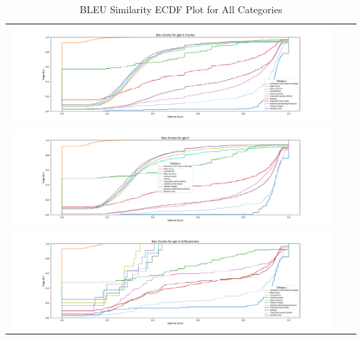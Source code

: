 \documentclass{article}
\begin{document}
\begin{table}[ht] 
\centering 
\begin{tabular}{ccc} 
\includegraphics[width=1.0\textwidth]{plots/bleu-ecdf-plot-gpt-3.5-turbo.png}  \\  
\includegraphics[width=1.0\textwidth]{plots/bleu-ecdf-plot-gpt-4.png}  \\ 
\includegraphics[width=1.0\textwidth]{plots/bleu-ecdf-plot-gpt-4-1106-preview.png}  \\ 
\end{tabular} 
\caption{BLEU Similarity ECDF Plot for All Categories} 
\label{tab:images} 
\end{table}
\end{document}
